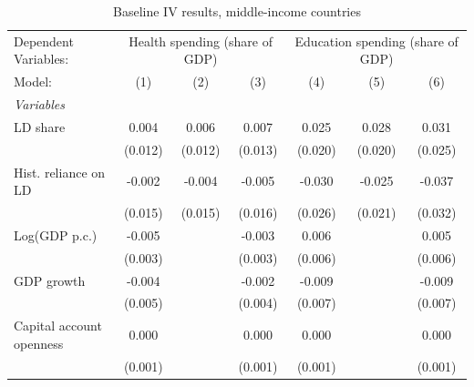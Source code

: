 
\begin{table}[htbp]
   \caption{\label{tab:app_results_baseline_iv_overall_other} Baseline IV results, middle-income countries}
   \centering
   \begin{tabular}{lcccccc}
      \tabularnewline \midrule \midrule
      Dependent Variables: & \multicolumn{3}{c}{Health spending (share of GDP)} & \multicolumn{3}{c}{Education spending (share of GDP)}\\
      Model:                     & (1)               & (2)               & (3)               & (4)               & (5)               & (6)\\  
      \midrule
      \emph{Variables}\\
      LD share                   & 0.004             & 0.006             & 0.007             & 0.025             & 0.028             & 0.031\\   
                                 & (0.012)           & (0.012)           & (0.013)           & (0.020)           & (0.020)           & (0.025)\\   
      Hist. reliance on LD       & -0.002            & -0.004            & -0.005            & -0.030            & -0.025            & -0.037\\   
                                 & (0.015)           & (0.015)           & (0.016)           & (0.026)           & (0.021)           & (0.032)\\   
      Log(GDP p.c.)              & -0.005            &                   & -0.003            & 0.006             &                   & 0.005\\   
                                 & (0.003)           &                   & (0.003)           & (0.006)           &                   & (0.006)\\   
      GDP growth                 & -0.004            &                   & -0.002            & -0.009            &                   & -0.009\\   
                                 & (0.005)           &                   & (0.004)           & (0.007)           &                   & (0.007)\\   
      Capital account openness   & 0.000             &                   & 0.000             & 0.000             &                   & 0.000\\   
                                 & (0.001)           &                   & (0.001)           & (0.001)           &                   & (0.001)\\   

\end{tabular}
\end{table}
